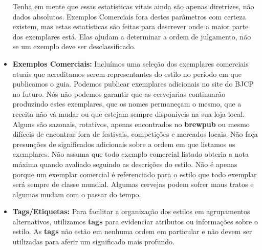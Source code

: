 \begin{itemize}
Tenha em mente que essas estatísticas vitais ainda são apenas diretrizes, não dados absolutos. Exemplos Comerciais fora destes parâmetros com certeza existem, mas estas estatísticas são feitas para descrever onde a maior parte dos exemplares está. Elas ajudam a determinar a ordem de julgamento, não se um exemplo deve ser desclassificado.
\item \textbf{Exemplos Comerciais:} Incluímos uma seleção dos exemplares comerciais atuais que acreditamos serem representantes do estilo no período em que publicamos o guia. Podemos publicar exemplares adicionais no site do BJCP no futuro. Nós não podemos garantir que as cervejarias continuarão produzindo estes exemplares, que os nomes permaneçam o mesmo, que a receita não vá mudar ou que estejam sempre disponíveis na sua loja local. Alguns são sazonais, rotativos, apenas encontrados no \textbf{brewpub} ou mesmo difíceis de encontrar fora de festivais, competições e mercados locais.
Não faça presunções de significados adicionais sobre a ordem em que listamos os exemplares. Não assuma que todo exemplo comercial listado obteria a nota máxima quando avaliado seguindo as descrições do estilo. Não é apenas porque um exemplar comercial é referenciado para o estilo que todo exemplar será sempre de classe mundial. Algumas cervejas podem sofrer maus tratos e algumas mudam com o passar do tempo.
\item \textbf{Tags/Etiquetas:} Para facilitar a organização dos estilos em agrupamentos alternativos, utilizamos \textbf{tags} para evidenciar atributos ou informações sobre o estilo. As \textbf{tags} não estão em nenhuma ordem em particular e não devem ser utilizadas para aferir um significado mais profundo.
\end{itemize}